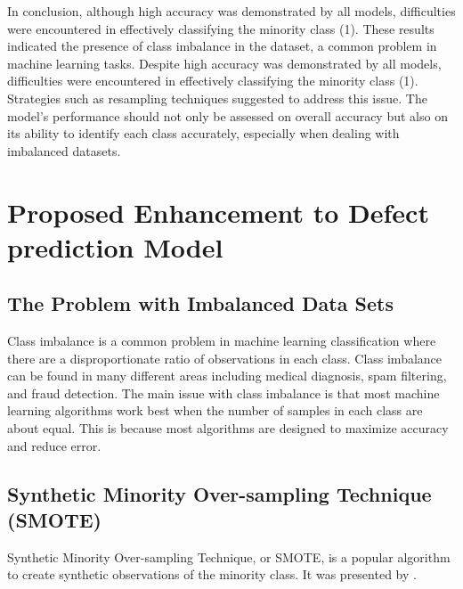 \documentclass[12pt]{report}
\begin{document}

\newpage
In conclusion, although high accuracy was demonstrated by all models, difficulties were encountered in effectively classifying the minority class (1). These results indicated the presence of class imbalance in the dataset, a common problem in machine learning tasks. Despite high accuracy was demonstrated by all models, difficulties were encountered in effectively classifying the minority class (1). Strategies such as resampling techniques suggested to address this issue. The model's performance should not only be assessed on overall accuracy but also on its ability to identify each class accurately, especially when dealing with imbalanced datasets.

\chapter*{Proposed Enhancement to Defect prediction Model}

\section*{The Problem with Imbalanced Data Sets}
Class imbalance is a common problem in machine learning classification where there are a disproportionate ratio of observations in each class. Class imbalance can be found in many different areas including medical diagnosis, spam filtering, and fraud detection. The main issue with class imbalance is that most machine learning algorithms work best when the number of samples in each class are about equal. This is because most algorithms are designed to maximize accuracy and reduce error.

\section*{Synthetic Minority Over-sampling Technique (SMOTE)}

Synthetic Minority Over-sampling Technique, or SMOTE, is a popular algorithm to
create synthetic observations of the minority class. It was presented by
\cite{chawla2002smote}.\\
\end{document}
